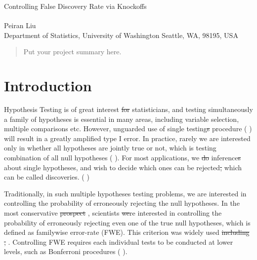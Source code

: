 \documentclass{uwstat572}
\newcommand{\vmdel}[1]{\sout{#1}}
\newcommand{\vmadd}[1]{\textbf{\color{red}{#1}}}
\newcommand{\vmcomment}[1]{({\color{blue}{VM's comment:}} \textbf{\color{blue}{#1}})}
\begin{document}

\begin{center}
  {\LARGE Controlling False Discovery Rate via Knockoffs}\\\ \\
  {Peiran Liu \\ 
    Department of Statistics, University of Washington Seattle, WA, 98195, USA
  }
\end{center}



\begin{abstract}
  Put your project summary here.
\end{abstract}

\section{Introduction}
Hypothesis Testing is of great interest \vmdel{for} \vmadd{to} statisticians, and testing simultaneously a family of hypotheses is essential in many areas, including variable selection, multiple comparisons\vmadd{,} etc. However, unguarded use of single testing\vmdel{s} procedure \vmcomment{What is a single testing procedure?} will result in a greatly amplified type I error. 
In practice, rarely we are interested only in whether all hypotheses are jointly true or not, which is testing combination of all null hypotheses \vmcomment{I didn't understand the part after ``whicn"}. 
For most applications, we \vmdel{do} \vmadd{perform} inference\vmdel{s} about single hypotheses, and wish to decide which ones can be rejected\vmdel{,} \vmadd{and} which can be called discoveries. 
\vmcomment{Add references and maybe a concrete scientific example.}

Traditionally, in such multiple hypotheses testing problems, we are interested in controlling the probability of erroneously rejecting the null hypotheses. 
In the most conservative \vmdel{prospect} \vmadd{scenario}, scientists \vmdel{we}\vmadd{a}re interested in controlling the probability of erroneously rejecting even one of the true null hypotheses, which is defined as familywise error-rate (FWE). 
This criterion was widely used\vmadd{, with methodology development contributions from} \vmdel{including} \cite{hochberg2009multiple}\vmdel{,} \vmadd{and} \cite{westfall1993resampling} \vmadd{to name a few}. Controlling FWE requires each individual tests to be conducted at lower levels, such as Bonferroni procedures \vmcomment{Not clear what do you mean by levels; also Bonferroni proceduere is not defined and lacks a reference}. 
\end{document}
